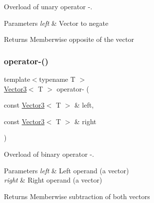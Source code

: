 Overload of unary operator -\/. 


\begin{DoxyParams}{Parameters}
{\em left} & Vector to negate\\
\hline
\end{DoxyParams}
\begin{DoxyReturn}{Returns}
Memberwise opposite of the vector \begin{DoxyVerb}\end{DoxyVerb}
 
\end{DoxyReturn}
\mbox{\label{classsf_1_1_vector3_abe0b9411c00cf807bf8a5f835874bd2a}} 
\subsubsection{\texorpdfstring{operator-\/()}{operator-()}\hspace{0.1cm}{\footnotesize\ttfamily [2/2]}}
{\footnotesize\ttfamily template$<$typename T $>$ \\
\mbox{\hyperlink{classsf_1_1_vector3}{Vector3}}$<$ T $>$ operator-\/ (\begin{DoxyParamCaption}\item[{const \mbox{\hyperlink{classsf_1_1_vector3}{Vector3}}$<$ T $>$ \&}]{left,  }\item[{const \mbox{\hyperlink{classsf_1_1_vector3}{Vector3}}$<$ T $>$ \&}]{right }\end{DoxyParamCaption})\hspace{0.3cm}{\ttfamily [related]}}



Overload of binary operator -\/. 


\begin{DoxyParams}{Parameters}
{\em left} & Left operand (a vector) \\
\hline
{\em right} & Right operand (a vector)\\
\hline
\end{DoxyParams}
\begin{DoxyReturn}{Returns}
Memberwise subtraction of both vectors \begin{DoxyVerb}\end{DoxyVerb}
 
\end{DoxyReturn}
\mbox{\label{classsf_1_1_vector3_aa465672d2a4ee5fd354e585cf08d2ab9}} 
